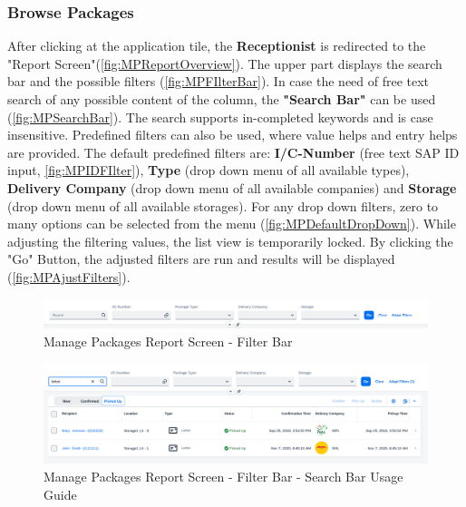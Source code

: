 \subsubsection{Browse Packages}
After clicking at the application tile, the \textbf{Receptionist} is redirected to the "Report Screen"(\autoref{fig:MPReportOverview}). 
The upper part displays the search bar and the possible filters (\autoref{fig:MPFIlterBar}). 
In case the need of free text search of any possible content of the column, the \textbf{"Search Bar"} can be used (\autoref{fig:MPSearchBar}). The search supports in-completed keywords and is case insensitive. Predefined filters can also be used, where value helps and entry helps are provided.
The default predefined filters are: \textbf{I/C-Number} (free text SAP ID input, \autoref{fig:MPIDFIlter}), \textbf{Type} (drop down menu of all available types), \textbf{Delivery Company} (drop down menu of all available companies) and \textbf{Storage} (drop down menu of all available storages). 
For any drop down filters, zero to many options can be selected from the menu (\autoref{fig:MPDefaultDropDown}). While adjusting the filtering values, the list view is temporarily locked. By clicking the "Go" Button, the adjusted filters are run and results will be displayed (\autoref{fig:MPAjustFilters}).

\begin{figure}[H]
	\centering
	\includegraphics[width=1\linewidth]{images/user_doc/managePack/ReportScreen/browse/FilterBar.png}
	\caption{Manage Packages Report Screen - Filter Bar}
	\label{fig:MPFIlterBar}
\end{figure}

\begin{figure}[htb]
	\centering
	\includegraphics[width=1\linewidth]{images/user_doc/managePack/ReportScreen/browse/defaultSearchBarUsage.png}
	\caption{Manage Packages Report Screen - Filter Bar - Search Bar Usage Guide}
	\label{fig:MPSearchBar}
\end{figure}

